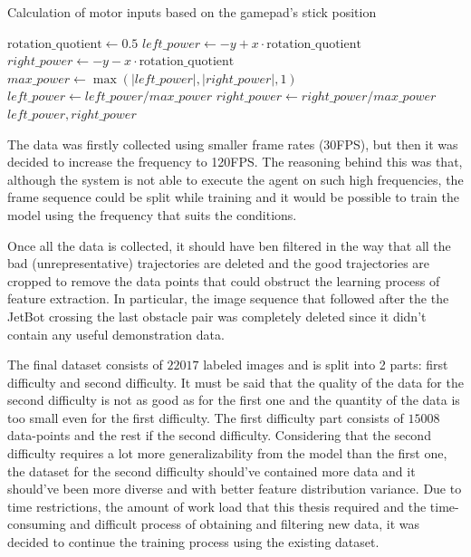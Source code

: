 \begin{algorithm}
  \caption{Calculation of motor inputs based on the gamepad's stick position}
  \begin{algorithmic}[1]
    \State $\text{rotation\_quotient} \gets 0.5$
    \State $left\_power \gets -y + x \cdot \text{rotation\_quotient}$
    \State $right\_power \gets -y - x \cdot \text{rotation\_quotient}$
    \State $max\_power \gets \max\left( \left|left\_power\right|, \left|right\_power\right|, 1 \right)$
    \State $left\_power \gets left\_power / max\_power$
    \State $right\_power \gets right\_power / max\_power$
    \State \Return $left\_power, right\_power$
    \EndFunction
  \end{algorithmic}
  \label{alg:motor_inputs}
\end{algorithm}

The data was firstly collected using smaller frame rates (30FPS), but then it was decided to increase the frequency to 120FPS. The reasoning behind this was that, although the system is not able to execute the agent on such high frequencies, the frame sequence could be split while training and it would be possible to train the model using the frequency that suits the conditions.

Once all the data is collected, it should have ben filtered in the way that all the bad (unrepresentative) trajectories are deleted and the good trajectories are cropped to remove the data points that could obstruct the learning process of feature extraction. In particular, the image sequence that followed after the the JetBot crossing the last obstacle pair was completely deleted since it didn't contain any useful demonstration data.

The final dataset consists of $22017$ labeled images and is split into 2 parts: first difficulty and second difficulty. It must be said that the quality of the data for the second difficulty is not as good as for the first one and the quantity of the data is too small even for the first difficulty. The first difficulty part consists of $15008$ data-points and the rest if the second difficulty. Considering that the second difficulty requires a lot more generalizability from the model than the first one, the dataset for the second difficulty should've contained more data and it should've been more diverse and with better feature distribution variance. Due to time restrictions, the amount of work load that this thesis required and the time-consuming and difficult process of obtaining and filtering new data, it was decided to continue the training process using the existing dataset.

